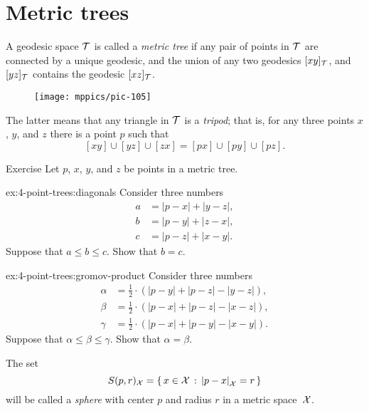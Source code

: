 \section{Metric trees}

A geodesic space $\mathcal{T}$ is called a \emph{metric tree} if any pair of points in $\mathcal{T}$ are connected by a unique geodesic,
and the union of any two geodesics $[xy]_{\mathcal{T}}$, and $[yz]_{\mathcal{T}}$ contains the geodesic $[xz]_{\mathcal{T}}$.

{

\begin{wrapfigure}{r}{25 mm}
\vskip-6mm
\centering
\texttt{[image: mppics/pic-105]}
\end{wrapfigure}

The latter means that any triangle in $\mathcal{T}$ is a \emph{tripod};
that is, for any three points $x$, $y$, and $z$ there is a point $p$ such that 
\[[xy]\cup[yz]\cup[zx]=[px]\cup[py]\cup[pz].\]

}

\begin{thm}{Exercise}\label{ex:4-point-trees}
Let $p$, $x$, $y$, and $z$ be points in a metric tree.

\begin{subthm}{ex:4-point-trees:diagonals}
Consider three numbers 
\begin{align*}
a&=|p-x|+|y-z|,
\\
b&=|p-y|+|z-x|,
\\
c&=|p-z|+|x-y|.
\end{align*}
Suppose that $a\le b\le c$.
Show that $b=c$.
\end{subthm}

\begin{subthm}{ex:4-point-trees:gromov-product}
Consider three numbers 
\begin{align*}
\alpha&=\tfrac12\cdot(|p-y|+|p-z|-|y-z|),
\\
\beta &=\tfrac12\cdot(|p-x|+|p-z|-|x-z|),
\\
\gamma&=\tfrac12\cdot(|p-x|+|p-y|-|x-y|).
\end{align*}
Suppose that $\alpha\le \beta\le \gamma$.
Show that $\alpha=\beta$.
\end{subthm}

\end{thm}

The set 
\[S(p,r)_{\spc{X}}=\set{x\in\spc{X}}{\dist{p}{x}{\spc{X}}=r}\]
will be called a \emph{sphere} with center $p$ and radius $r$ in a metric space~$\mathcal{X}$.


